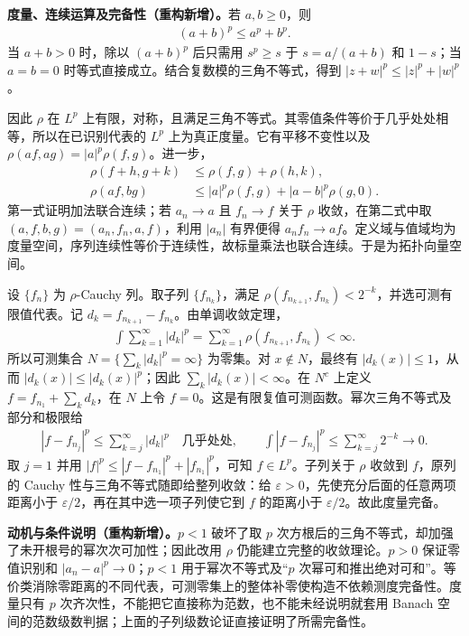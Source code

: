 \documentclass[../../main.tex]{subfiles}
\begin{document}
\begin{solution}
\textbf{度量、连续运算及完备性（重构新增）。}若 $a,b\geqslant0$，则
\begin{align*}
(a+b)^p\leqslant a^p+b^p.
\end{align*}
当 $a+b>0$ 时，除以 $(a+b)^p$ 后只需用 $s^p\geqslant s$ 于 $s=a/(a+b)$ 和 $1-s$；当 $a=b=0$ 时等式直接成立。结合复数模的三角不等式，得到 $|z+w|^p\leqslant|z|^p+|w|^p$。

因此 $\rho$ 在 $L^p$ 上有限，对称，且满足三角不等式。其零值条件等价于几乎处处相等，所以在已识别代表的 $L^p$ 上为真正度量。它有平移不变性以及 $\rho(af,ag)=|a|^p\rho(f,g)$。进一步，
\begin{align*}
\rho(f+h,g+k)&\leqslant\rho(f,g)+\rho(h,k),\\
\rho(af,bg)&\leqslant|a|^p\rho(f,g)+|a-b|^p\rho(g,0).
\end{align*}
第一式证明加法联合连续；若 $a_n\to a$ 且 $f_n\to f$ 关于 $\rho$ 收敛，在第二式中取 $(a,f,b,g)=(a_n,f_n,a,f)$，利用 $|a_n|$ 有界便得 $a_nf_n\to af$。定义域与值域均为度量空间，序列连续性等价于连续性，故标量乘法也联合连续。于是为拓扑向量空间。

设 $\{f_n\}$ 为 $\rho$-Cauchy 列。取子列 $\{f_{n_k}\}$，满足 $\rho(f_{n_{k+1}},f_{n_k})<2^{-k}$，并选可测有限值代表。记 $d_k=f_{n_{k+1}}-f_{n_k}$。由单调收敛定理，
\begin{align*}
\int\sum_{k=1}^\infty|d_k|^p=\sum_{k=1}^\infty\rho(f_{n_{k+1}},f_{n_k})<\infty.
\end{align*}
所以可测集合 $N=\{\sum_k|d_k|^p=\infty\}$ 为零集。对 $x\notin N$，最终有 $|d_k(x)|\leqslant1$，从而 $|d_k(x)|\leqslant|d_k(x)|^p$；因此 $\sum_k|d_k(x)|<\infty$。在 $N^c$ 上定义 $f=f_{n_1}+\sum_kd_k$，在 $N$ 上令 $f=0$。这是有限复值可测函数。幂次三角不等式及部分和极限给
\begin{align*}
|f-f_{n_j}|^p\leqslant\sum_{k=j}^\infty|d_k|^p\quad\text{几乎处处},
\qquad
\int|f-f_{n_j}|^p\leqslant\sum_{k=j}^\infty2^{-k}\longrightarrow0.
\end{align*}
取 $j=1$ 并用 $|f|^p\leqslant|f-f_{n_1}|^p+|f_{n_1}|^p$，可知 $f\in L^p$。子列关于 $\rho$ 收敛到 $f$，原列的 Cauchy 性与三角不等式随即给整列收敛：给 $\varepsilon>0$，先使充分后面的任意两项距离小于 $\varepsilon/2$，再在其中选一项子列使它到 $f$ 的距离小于 $\varepsilon/2$。故此度量完备。
\end{solution}
\begin{remark}
\textbf{动机与条件说明（重构新增）。}$p<1$ 破坏了取 $p$ 次方根后的三角不等式，却加强了未开根号的幂次次可加性；因此改用 $\rho$ 仍能建立完整的收敛理论。$p>0$ 保证零值识别和 $|a_n-a|^p\to0$；$p<1$ 用于幂次不等式及“$p$ 次幂可和推出绝对可和”。等价类消除零距离的不同代表，可测零集上的整体补零使构造不依赖测度完备性。度量只有 $p$ 次齐次性，不能把它直接称为范数，也不能未经说明就套用 Banach 空间的范数级数判据；上面的子列级数论证直接证明了所需完备性。
\end{remark}
\end{document}
